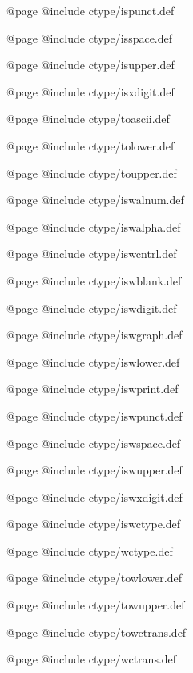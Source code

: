 @page
@include ctype/ispunct.def

@page
@include ctype/isspace.def

@page
@include ctype/isupper.def

@page
@include ctype/isxdigit.def

@page
@include ctype/toascii.def

@page
@include ctype/tolower.def

@page
@include ctype/toupper.def

@page
@include ctype/iswalnum.def

@page
@include ctype/iswalpha.def

@page
@include ctype/iswcntrl.def

@page
@include ctype/iswblank.def

@page
@include ctype/iswdigit.def

@page
@include ctype/iswgraph.def

@page
@include ctype/iswlower.def

@page
@include ctype/iswprint.def

@page
@include ctype/iswpunct.def

@page
@include ctype/iswspace.def

@page
@include ctype/iswupper.def

@page
@include ctype/iswxdigit.def

@page
@include ctype/iswctype.def

@page
@include ctype/wctype.def

@page
@include ctype/towlower.def

@page
@include ctype/towupper.def

@page
@include ctype/towctrans.def

@page
@include ctype/wctrans.def


